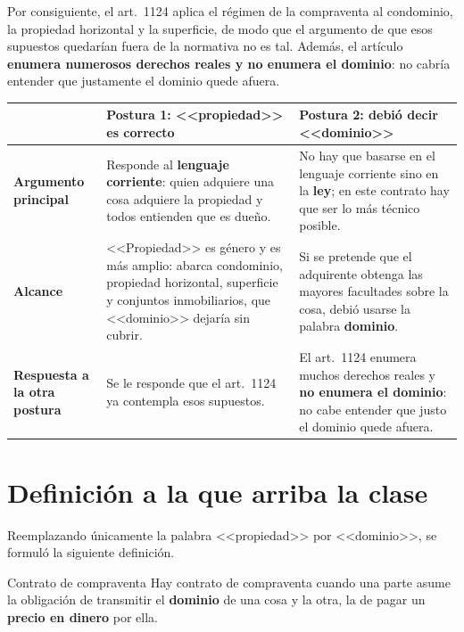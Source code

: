 \documentclass[12pt,oneside]{book}
\begin{document}

Por consiguiente, el art.~1124 aplica el régimen de la compraventa al condominio, la propiedad horizontal y la superficie, de modo que el argumento de que esos supuestos quedarían fuera de la normativa no es tal. Además, el artículo \textbf{enumera numerosos derechos reales y no enumera el dominio}: no cabría entender que justamente el dominio quede afuera.

\begin{table}[H]
\centering
\small
\begin{tabularx}{\textwidth}{>{\raggedright\arraybackslash}p{} >{\raggedright\arraybackslash}X >{\raggedright\arraybackslash}X}
\toprule
 & \textbf{Postura 1: <<propiedad>> es correcto} & \textbf{Postura 2: debió decir <<dominio>>} \\
\midrule
\textbf{Argumento principal} &
Responde al \textbf{lenguaje corriente}: quien adquiere una cosa adquiere la propiedad y todos entienden que es dueño. &
No hay que basarse en el lenguaje corriente sino en la \textbf{ley}; en este contrato hay que ser lo más técnico posible. \\

\textbf{Alcance} &
<<Propiedad>> es género y es más amplio: abarca condominio, propiedad horizontal, superficie y conjuntos inmobiliarios, que <<dominio>> dejaría sin cubrir. &
Si se pretende que el adquirente obtenga las mayores facultades sobre la cosa, debió usarse la palabra \textbf{dominio}. \\

\textbf{Respuesta a la otra postura} &
Se le responde que el art.~1124 ya contempla esos supuestos. &
El art.~1124 enumera muchos derechos reales y \textbf{no enumera el dominio}: no cabe entender que justo el dominio quede afuera. \\
\bottomrule
\end{tabularx}
\end{table}

\section{Definición a la que arriba la clase}

Reemplazando únicamente la palabra <<propiedad>> por <<dominio>>, se formuló la siguiente definición.

\begin{definition}{Contrato de compraventa}
Hay contrato de compraventa cuando una parte asume la obligación de transmitir el \textbf{dominio} de una cosa y la otra, la de pagar un \textbf{precio en dinero} por ella.
\end{definition}
\end{document}
